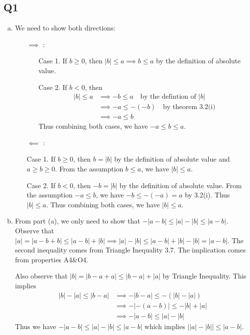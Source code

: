 \documentclass[12pt,lettersize]{article}
\begin{document}
\subsection*{Q1}
\begin{enumerate}[(a)]
	\item We need to show both directions:
	\begin{itemize}
		\item[$\implies$]:
		\begin{itemize}
			\item[Case 1.] If $b\geq0$, then $|b|\leq a\implies b\leq a$ by the definition of absolute value.
			\item[Case 2.] If $b<0$, then 
			\begin{align*}
				|b|\leq a &\implies -b\leq a\quad\text{by the defintion of $|b|$}\\
					      &\implies -a\leq -(-b)\quad\text{by theorem 3.2(i)}\\
					      &\implies -a\leq b
			\end{align*}
			Thus combining both cases, we have $-a\leq b\leq a$.
		\end{itemize}
		\item[$\impliedby$]: 
			\item[Case 1.] If $b\geq0$, then $b=|b|$ by the definition of absolute value and $a\geq b\geq0$. From the assumption $b\leq a$, we have $|b|\leq a$.
			\item[Case 2.] If $b<0$, then $-b=|b|$ by the definition of absolute value. From the assumption $-a\leq b$, we have $-b\leq-(-a)=a$ by 3.2(i). Thus $|b|\leq a$.
			Thus combining both cases, we have $|b|\leq a$.
	\end{itemize}
	\item From part (a), we only need to show that $-|a-b|\leq|a|-|b|\leq|a-b|$. Observe that $|a|=|a-b+b|\leq|a-b|+|b|\implies |a|-|b|\leq|a-b|+|b|-|b|=|a-b|$. The second inequality comes from Triangle Inequality 3.7. The implication comes from properties A4\&O4.
	
	Also observe that $|b|=|b-a+a|\leq|b-a|+|a|$ by Triangle Inequality. This implies
	\begin{align*}
		|b|-|a|\leq|b-a|&\implies-|b-a|\leq-(|b|-|a|)\\
						&\implies-|-(a-b)|\leq-|b|+|a|\\
						&\implies-|a-b|\leq|a|-|b|
	\end{align*}
	Thus we have $-|a-b|\leq|a|-|b|\leq|a-b|$ which implies $\big||a|-|b|\big|\leq|a-b|$.
\end{enumerate}
\newpage
\end{document}
